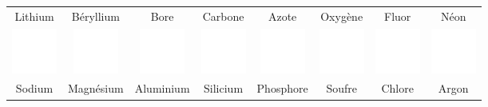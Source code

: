 \documentclass[
  11pt,
  french,
  a4paper,
  openany]{book}
\begin{document}
\begin{longtable}[]{@{}cccccccc@{}}
Lithium & Béryllium & Bore & Carbone & Azote & Oxygène & Fluor & Néon\tabularnewline
\includegraphics[width=\textwidth,height=4em]{images/1px.png} & \includegraphics[width=\textwidth,height=4em]{images/1px.png} & \includegraphics[width=\textwidth,height=4em]{images/1px.png} & \includegraphics[width=\textwidth,height=4em]{images/1px.png} & \includegraphics[width=\textwidth,height=4em]{images/1px.png} & \includegraphics[width=\textwidth,height=4em]{images/1px.png} & \includegraphics[width=\textwidth,height=4em]{images/1px.png} & \includegraphics[width=\textwidth,height=4em]{images/1px.png}\tabularnewline
Sodium & Magnésium & Aluminium & Silicium & Phosphore & Soufre & Chlore & Argon\tabularnewline

\end{longtable}
\end{document}
